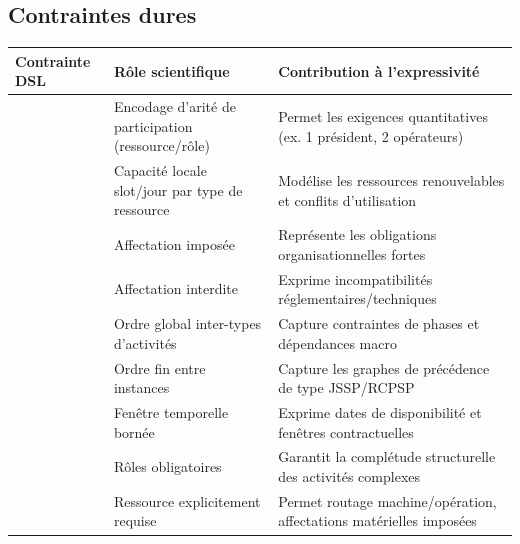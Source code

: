 \documentclass[12pt,a4paper]{article}
\begin{document}
\subsection{Contraintes dures}
\begin{center}
\small
\begin{tabularx}{\textwidth}{L{0.26\textwidth} X X}
\toprule
\textbf{Contrainte DSL} & \textbf{Rôle scientifique} & \textbf{Contribution à l'expressivité} \\
\midrule
\texttt{} & Encodage d'arité de participation (ressource/rôle) & Permet les exigences quantitatives (ex. 1 président, 2 opérateurs) \\
\texttt{} & Capacité locale slot/jour par type de ressource & Modélise les ressources renouvelables et conflits d'utilisation \\
\texttt{} & Affectation imposée & Représente les obligations organisationnelles fortes \\
\texttt{} & Affectation interdite & Exprime incompatibilités réglementaires/techniques \\
\texttt{} & Ordre global inter-types d'activités & Capture contraintes de phases et dépendances macro \\
\texttt{} & Ordre fin entre instances & Capture les graphes de précédence de type JSSP/RCPSP \\
\texttt{} & Fenêtre temporelle bornée & Exprime dates de disponibilité et fenêtres contractuelles \\
\texttt{} & Rôles obligatoires & Garantit la complétude structurelle des activités complexes \\
\texttt{} & Ressource explicitement requise & Permet routage machine/opération, affectations matérielles imposées \\
\bottomrule
\end{tabularx}
\end{center}
\end{document}
